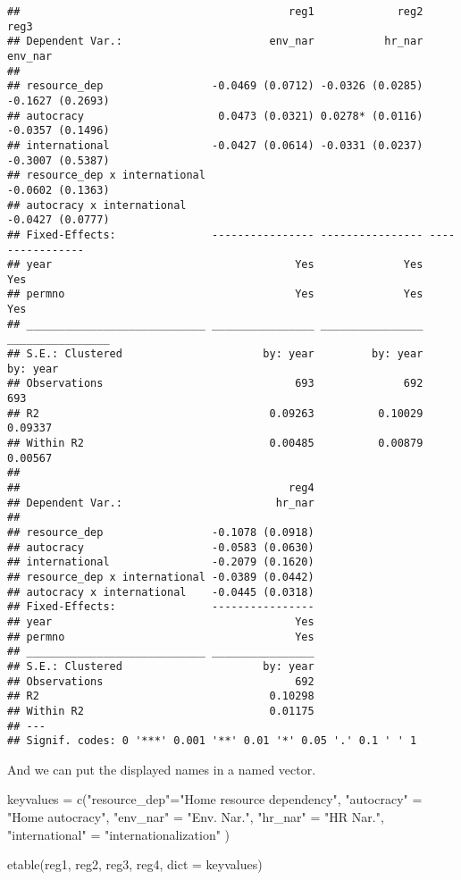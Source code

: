 \documentclass[
]{article}
\newenvironment{Shaded}{\begin{snugshade}}{\end{snugshade}}
\newcommand{\AttributeTok}[1]{\textcolor[rgb]{0.77,0.63,0.00}{#1}}
\newcommand{\FunctionTok}[1]{\textcolor[rgb]{0.00,0.00,0.00}{#1}}
\newcommand{\NormalTok}[1]{#1}
\newcommand{\OtherTok}[1]{\textcolor[rgb]{0.56,0.35,0.01}{#1}}
\newcommand{\StringTok}[1]{\textcolor[rgb]{0.31,0.60,0.02}{#1}}
\begin{document}
\begin{verbatim}
##                                          reg1             reg2             reg3
## Dependent Var.:                       env_nar           hr_nar          env_nar
##                                                                                
## resource_dep                 -0.0469 (0.0712) -0.0326 (0.0285) -0.1627 (0.2693)
## autocracy                     0.0473 (0.0321) 0.0278* (0.0116) -0.0357 (0.1496)
## international                -0.0427 (0.0614) -0.0331 (0.0237) -0.3007 (0.5387)
## resource_dep x international                                   -0.0602 (0.1363)
## autocracy x international                                      -0.0427 (0.0777)
## Fixed-Effects:               ---------------- ---------------- ----------------
## year                                      Yes              Yes              Yes
## permno                                    Yes              Yes              Yes
## ____________________________ ________________ ________________ ________________
## S.E.: Clustered                      by: year         by: year         by: year
## Observations                              693              692              693
## R2                                    0.09263          0.10029          0.09337
## Within R2                             0.00485          0.00879          0.00567
## 
##                                          reg4
## Dependent Var.:                        hr_nar
##                                              
## resource_dep                 -0.1078 (0.0918)
## autocracy                    -0.0583 (0.0630)
## international                -0.2079 (0.1620)
## resource_dep x international -0.0389 (0.0442)
## autocracy x international    -0.0445 (0.0318)
## Fixed-Effects:               ----------------
## year                                      Yes
## permno                                    Yes
## ____________________________ ________________
## S.E.: Clustered                      by: year
## Observations                              692
## R2                                    0.10298
## Within R2                             0.01175
## ---
## Signif. codes: 0 '***' 0.001 '**' 0.01 '*' 0.05 '.' 0.1 ' ' 1
\end{verbatim}

And we can put the displayed names in a named vector.

\begin{Shaded}
\begin{Highlighting}[]
\NormalTok{keyvalues }\OtherTok{=} \FunctionTok{c}\NormalTok{(}\StringTok{"resource\_dep"}\OtherTok{=}\StringTok{"Home resource dependency"}\NormalTok{,}
              \StringTok{"autocracy"} \OtherTok{=} \StringTok{"Home autocracy"}\NormalTok{,}
              \StringTok{"env\_nar"} \OtherTok{=} \StringTok{"Env. Nar."}\NormalTok{,}
              \StringTok{"hr\_nar"} \OtherTok{=} \StringTok{"HR Nar."}\NormalTok{,}
              \StringTok{"international"} \OtherTok{=} \StringTok{"internationalization"}
\NormalTok{              )}

\FunctionTok{etable}\NormalTok{(reg1, reg2, reg3, reg4, }\AttributeTok{dict =}\NormalTok{ keyvalues)}
\end{Highlighting}
\end{Shaded}
\end{document}
